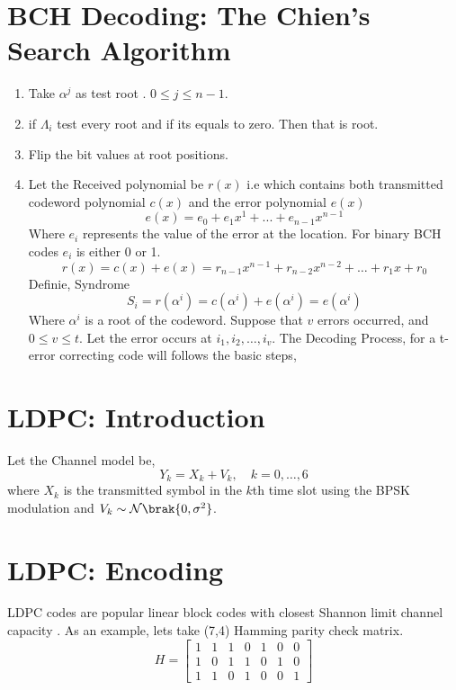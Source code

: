 \documentclass[journal,12pt,twocolumn]{IEEEtran}
\renewcommand\thesection{\arabic{section}}
\begin{document}
\section{BCH Decoding: The Chien's Search Algorithm}
\begin{enumerate}[label=\thesection.\arabic*
,ref=\thesection.\theenumi]
\item Take $\alpha ^j$ as test root . $0\leq j \leq n-1$.
\item if $\Lambda_i $ test every root and if its equals to zero. Then that is root.
\item  Flip the bit values at root positions.
\item Let the Received polynomial be $r(x)$ i.e which contains both transmitted codeword polynomial $c(x)$ and 
the 
error polynomial $e(x)$ \begin{equation}
e(x)=e_0+e_1x^1+...+e_{n-1}x^{n-1}
\end{equation} Where $e_i$ represents the value of the error at the location. For binary BCH codes  $e_i$ is 
either 0 or 1.
\begin{equation}
r(x)=c(x)+e(x)=r_{n-1}x^{n-1}+r_{n-2}x^{n-2}+\dots+r_1x+r_0
\end{equation}
Definie, Syndrome \begin{equation}
S_i=r(\alpha^i)=c(\alpha^i)+e(\alpha^i)=e(\alpha^i)
\end{equation} Where $\alpha^i $ is a root of the codeword.
Suppose that $v$ errors occurred, and $0\leq v \leq t$.
Let the error occurs at $i_1,i_2,\dots,i_v$. 
The Decoding Process, for a t-error correcting code will follows the basic steps,
\end{enumerate}

\section{LDPC: Introduction}
Let the Channel model be,
\begin{equation}
Y_k= X_k + V_k, \quad k = 0,\dots,6
\end{equation} 
where $X_k$ is the  transmitted symbol in the $k$th time slot using the BPSK modulation and $V_k \sim \mathcal{N}\brak{0,\sigma^2} $. 

\section{LDPC: Encoding}
 LDPC codes are popular linear block codes with closest Shannon limit channel capacity \cite{ldpc}. As an example, lets take (7,4) Hamming parity check matrix.
 \begin{equation} \label{eq:H}
 H =  \begin{bmatrix} 
1 & 1 & 1 & 0 & 1 & 0 & 0 \\
1 & 0 & 1 & 1 & 0 & 1 & 0 \\
1 & 1 & 0 & 1 & 0 & 0 & 1 
\end{bmatrix}
 \end{equation}
\end{document}
